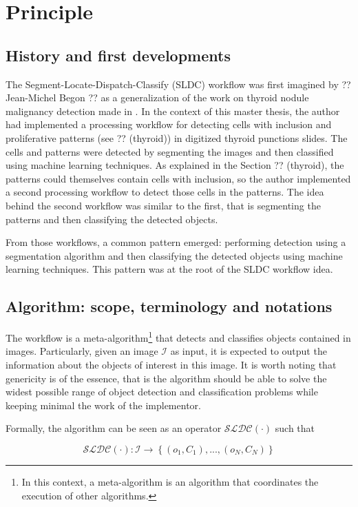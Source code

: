 \section{Principle}
\subsection{History and first developments}
\label{ssec:history_first_dev}
The Segment-Locate-Dispatch-Classify (SLDC) workflow was first imagined by ?? Jean-Michel Begon ?? as a generalization of the work on thyroid nodule malignancy detection made in \cite{adeblire2013}. In the context of this master thesis, the author had implemented a processing workflow for detecting cells with inclusion and proliferative patterns (see ?? (thyroid)) in digitized thyroid punctions slides. The cells and patterns were detected by segmenting the images and then classified using machine learning techniques. As explained in the Section ?? (thyroid), the patterns could themselves contain cells with inclusion, so the author implemented a second processing workflow to detect those cells in the patterns. The idea behind the second workflow was similar to the first, that is segmenting the patterns and then classifying the detected objects. 

From those workflows, a common pattern emerged: performing detection using a segmentation algorithm and then classifying the detected objects using machine learning techniques. This pattern was at the root of the SLDC workflow idea. 

\subsection{Algorithm: scope, terminology and notations}
The workflow is a meta-algorithm\footnote{In this context, a meta-algorithm is an algorithm that coordinates the execution of other algorithms.} that detects and classifies objects contained in images. Particularly, given an image $\mathcal{I}$ as input, it is expected to output the information about the objects of interest in this image. It is worth noting that genericity is of the essence, that is the algorithm should be able to solve the widest possible range of object detection and classification problems while keeping minimal the work of the implementor.
 
\begin{definition}
Formally, the algorithm can be seen as an operator $\mathcal{SLDC}(\cdot)$ such that

\begin{equation}
	\label{eqn:workflow_operator}
	\mathcal{SLDC}(\cdot) : \mathcal{I} \rightarrow \left\{(o_1,C_1),...,(o_N, C_N)\right\}
\end{equation}
\end{definition}

